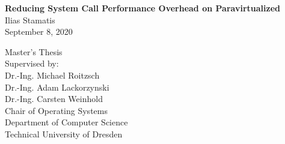 \documentclass[12pt]{report}
\begin{document}
    \begin{titlepage}
        \begin{center}

        \vspace*{2cm}
        \huge\textbf{Reducing System Call Performance Overhead on Paravirtualized \llinux}\\
        \vspace{1.5cm}
        \large Ilias Stamatis\\
        \vspace{0.5cm}
        September 8, 2020


        \vfill
        Master's Thesis\\
        \vspace{0.8cm}
        Supervised by:\\
        Dr.-Ing. Michael Roitzsch\\
        Dr.-Ing. Adam Lackorzynski\\
        Dr.-Ing. Carsten Weinhold\\
        \vspace{0.8cm}
        Chair of Operating Systems\\
        Department of Computer Science\\
        Technical University of Dresden\\

        \end{center}
    \end{titlepage}

    
    

    \tableofcontents
    \listoftables
    \listoffigures

    
    
    
    
    
    

    \nocite{*} %
    \printbibliography[heading=bibintoc]
\end{document}
